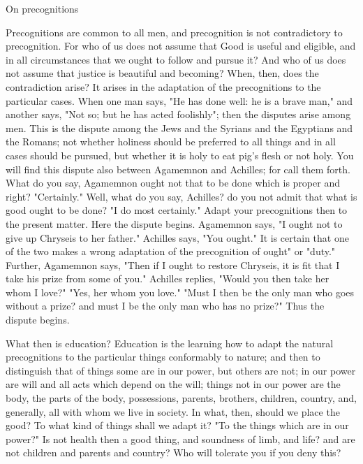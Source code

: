 \documentclass[a4paper]{article}
\begin{document}
On precognitions 

Precognitions are common to all men, and precognition is not contradictory
to precognition. For who of us does not assume that Good is useful
and eligible, and in all circumstances that we ought to follow and
pursue it? And who of us does not assume that justice is beautiful
and becoming? When, then, does the contradiction arise? It arises
in the adaptation of the precognitions to the particular cases. When
one man says, "He has done well: he is a brave man," and another says,
"Not so; but he has acted foolishly"; then the disputes arise among
men. This is the dispute among the Jews and the Syrians and the Egyptians
and the Romans; not whether holiness should be preferred to all things
and in all cases should be pursued, but whether it is holy to eat
pig's flesh or not holy. You will find this dispute also between Agamemnon
and Achilles; for call them forth. What do you say, Agamemnon ought
not that to be done which is proper and right? "Certainly." Well,
what do you say, Achilles? do you not admit that what is good ought
to be done? "I do most certainly." Adapt your precognitions then to
the present matter. Here the dispute begins. Agamemnon says, "I ought
not to give up Chryseis to her father." Achilles says, "You ought."
It is certain that one of the two makes a wrong adaptation of the
precognition of ought" or "duty." Further, Agamemnon says, "Then if
I ought to restore Chryseis, it is fit that I take his prize from
some of you." Achilles replies, "Would you then take her whom I love?"
"Yes, her whom you love." "Must I then be the only man who goes without
a prize? and must I be the only man who has no prize?" Thus the dispute
begins. 

What then is education? Education is the learning how to adapt the
natural precognitions to the particular things conformably to nature;
and then to distinguish that of things some are in our power, but
others are not; in our power are will and all acts which depend on
the will; things not in our power are the body, the parts of the body,
possessions, parents, brothers, children, country, and, generally,
all with whom we live in society. In what, then, should we place the
good? To what kind of things shall we adapt it? "To the things which
are in our power?" Is not health then a good thing, and soundness
of limb, and life? and are not children and parents and country? Who
will tolerate you if you deny this? 
\end{document}
